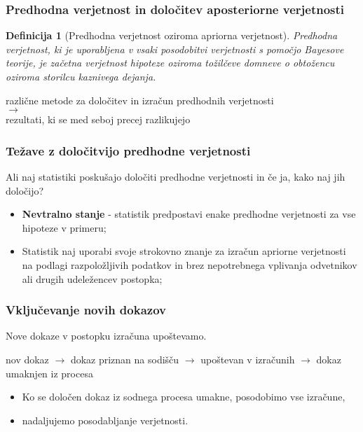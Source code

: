 \documentclass{beamer}
\newtheorem{definicija}{Definicija}
\begin{document}
\begin{frame}
   \frametitle{Predhodna verjetnost in določitev aposteriorne verjetnosti}
   \begin{definicija}[Predhodna verjetnost oziroma apriorna verjetnost]
      Predhodna verjetnost, ki je uporabljena v vsaki posodobitvi verjetnosti s pomočjo Bayesove teorije, je začetna verjetnost hipoteze 
      oziroma tožilčeve domneve o obtožencu oziroma storilcu kaznivega dejanja.
  \end{definicija} \vspace{3mm}
  \begin{block}{}
   \centering
   različne metode za določitev in izračun predhodnih verjetnosti\\ \vspace{2mm}
   $\rightarrow$ \\ \vspace{3mm}
   rezultati, ki se med seboj precej razlikujejo
   \end{block}
\end{frame}

\begin{frame}
   \frametitle{Težave z določitvijo predhodne verjetnosti}
   \begin{block}{Ali naj statistiki poskušajo določiti predhodne verjetnosti in če ja, kako naj jih določijo?}
       \begin{itemize}
           \item \textbf{Nevtralno stanje} - statistik predpostavi enake predhodne verjetnosti za vse hipoteze v primeru;
           \item Statistik naj uporabi svoje strokovno znanje za izračun apriorne verjetnosti na podlagi razpoložljivih podatkov in brez nepotrebnega vplivanja odvetnikov ali drugih udeležencev postopka;
       \end{itemize}
   \end{block}
\end{frame}

\begin{frame}
   \frametitle{Vključevanje novih dokazov}
   Nove dokaze v postopku izračuna upoštevamo. \vspace{3mm}
   \begin{block}{}
      \centering
      nov dokaz $\rightarrow$  dokaz priznan na sodišču $\rightarrow$ upoštevan v izračunih $\rightarrow$ dokaz umaknjen iz procesa
      \vspace{3mm}
   \end{block}
   \begin{itemize}
      \item Ko se določen dokaz iz sodnega procesa umakne, posodobimo vse izračune,
      \item nadaljujemo posodabljanje verjetnosti.
   \end{itemize}
\end{frame}
\end{document}
